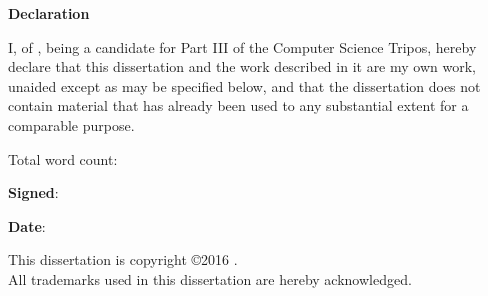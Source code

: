 \newpage
{\Huge \bf Declaration}

\vspace{24pt} 

I, \authorname of \authorcollege, being a candidate for Part  III of the
Computer Science Tripos, hereby declare that this dissertation and the work
described in it are my own work, unaided except as may be specified below, and
that the dissertation does not contain material that has already been used to
any substantial extent for a comparable purpose.

\vspace{24pt}
Total word count: \wordcount

\vspace{60pt}
\textbf{Signed}: 

\vspace{12pt}
\textbf{Date}:


\vfill

This dissertation is copyright \copyright 2016 \authorname. 
\\
All trademarks used in this dissertation are hereby acknowledged.



\newpage
\vspace*{\fill}

